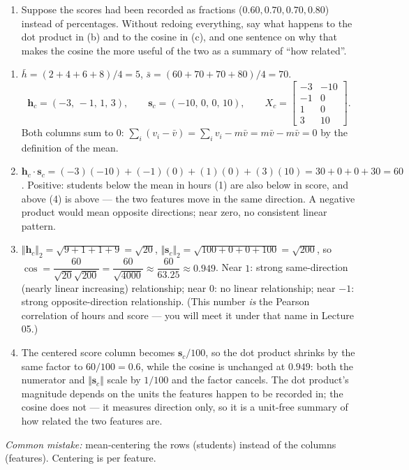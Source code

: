 \documentclass[
  11pt,
]{article}
\providecommand{\tightlist}{%
  \setlength{\itemsep}{0pt}\setlength{\parskip}{0pt}}
\begin{document}
\begin{enumerate}
\def\labelenumi{(\alph{enumi})}
\setcounter{enumi}{3}
\tightlist
\item
  Suppose the scores had been recorded as fractions
  (\(0.60, 0.70, 0.70, 0.80\)) instead of percentages. Without redoing
  everything, say what happens to the dot product in (b) and to the
  cosine in (c), and one sentence on why that makes the cosine the more
  useful of the two as a summary of ``how related''.
\end{enumerate}

\begin{solutionbox}

\begin{enumerate}
\def\labelenumi{(\alph{enumi})}
\item
  \(\bar h = (2+4+6+8)/4 = 5\), \(\bar s = (60+70+70+80)/4 = 70\).
  \[\mathbf{h}_c = (-3,\,-1,\,1,\,3), \qquad \mathbf{s}_c = (-10,\,0,\,0,\,10), \qquad
  X_c = \begin{bmatrix} -3 & -10\\ -1 & 0\\ 1 & 0\\ 3 & 10\end{bmatrix}.\]
  Both columns sum to \(0\):
  \(\sum_i (v_i - \bar v) = \sum_i v_i - m\bar v = m\bar v - m\bar v = 0\)
  by the definition of the mean.
\item
  \(\mathbf{h}_c\cdot\mathbf{s}_c = (-3)(-10) + (-1)(0) + (1)(0) + (3)(10) = 30 + 0 + 0 + 30 = 60\).
  Positive: students below the mean in hours (1) are also below in
  score, and above (4) is above --- the two features move in the same
  direction. A negative product would mean opposite directions; near
  zero, no consistent linear pattern.
\item
  \(\Vert\mathbf{h}_c\Vert_2 = \sqrt{9+1+1+9} = \sqrt{20}\),
  \(\Vert\mathbf{s}_c\Vert_2 = \sqrt{100+0+0+100} = \sqrt{200}\), so
  \(\cos = \dfrac{60}{\sqrt{20}\sqrt{200}} = \dfrac{60}{\sqrt{4000}} \approx \dfrac{60}{63.25} \approx 0.949\).
  Near \(1\): strong same-direction (nearly linear increasing)
  relationship; near \(0\): no linear relationship; near \(-1\): strong
  opposite-direction relationship. (This number \emph{is} the Pearson
  correlation of hours and score --- you will meet it under that name in
  Lecture 05.)
\item
  The centered score column becomes \(\mathbf{s}_c/100\), so the dot
  product shrinks by the same factor to \(60/100 = 0.6\), while the
  cosine is unchanged at \(0.949\): both the numerator and
  \(\Vert\mathbf{s}_c\Vert\) scale by \(1/100\) and the factor cancels.
  The dot product's magnitude depends on the units the features happen
  to be recorded in; the cosine does not --- it measures direction only,
  so it is a unit-free summary of how related the two features are.
\end{enumerate}

\emph{Common mistake:} mean-centering the rows (students) instead of the
columns (features). Centering is per feature.

\end{solutionbox}
\end{document}
